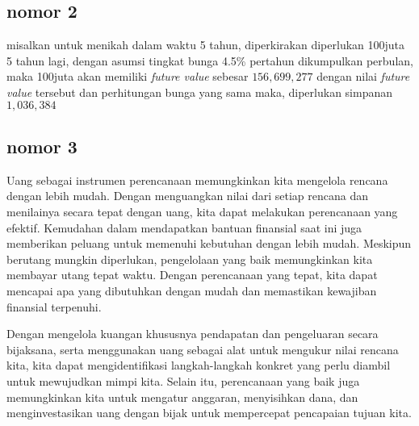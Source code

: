 \documentclass{article}
\begin{document}
\subsection*{nomor 2}
misalkan untuk menikah dalam waktu 5 tahun, diperkirakan diperlukan 100juta 5 tahun lagi, dengan asumsi tingkat bunga 4.5\% pertahun dikumpulkan perbulan, maka 100juta akan memiliki \emph{future value} sebesar
$156,699,277$ dengan nilai \emph{future value} tersebut dan perhitungan bunga yang sama maka, diperlukan simpanan $1,036,384$ 

\subsection*{nomor 3}
Uang sebagai instrumen perencanaan memungkinkan kita mengelola rencana dengan lebih mudah. Dengan menguangkan nilai dari setiap rencana dan menilainya secara tepat dengan uang, kita dapat melakukan perencanaan yang efektif. Kemudahan dalam mendapatkan bantuan finansial saat ini juga memberikan peluang untuk memenuhi kebutuhan dengan lebih mudah. Meskipun berutang mungkin diperlukan, pengelolaan yang baik memungkinkan kita membayar utang tepat waktu. Dengan perencanaan yang tepat, kita dapat mencapai apa yang dibutuhkan dengan mudah dan memastikan kewajiban finansial terpenuhi.

Dengan mengelola kuangan khususnya pendapatan dan pengeluaran secara bijaksana, serta menggunakan uang sebagai alat untuk mengukur nilai rencana kita, kita dapat mengidentifikasi langkah-langkah konkret yang perlu diambil untuk mewujudkan mimpi kita. Selain itu, perencanaan yang baik juga memungkinkan kita untuk mengatur anggaran, menyisihkan dana, dan menginvestasikan uang dengan bijak untuk mempercepat pencapaian tujuan kita.
\end{document}
